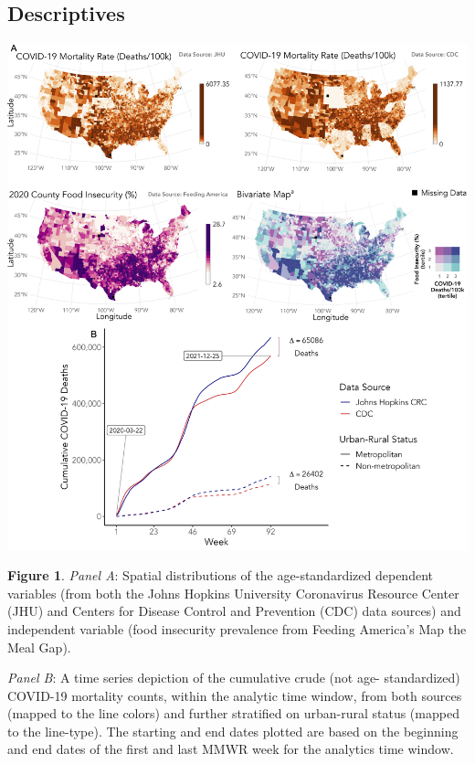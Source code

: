 \documentclass{beamer}
\begin{document}
\subsection{Descriptives}
\begin{frame}
	\begin{minipage}{.52\textwidth}
		\hspace{-0.5cm}
		\centering
		\includegraphics[scale=0.097]{images-logos/combo-chloro-time-series.png}\\
		
		
	\end{minipage}%
	\hspace{1.65 cm}
	\begin{minipage}{.30\textwidth}
			\vspace{-0.3 cm}
		\raggedright
	\tiny{\textbf{Figure 1}. \textit{Panel A}: Spatial distributions of the age-standardized dependent variables (from both the Johns Hopkins University Coronavirus Resource Center (JHU) and Centers for Disease Control and Prevention (CDC) data sources) and independent variable (food insecurity prevalence from Feeding America’s Map the Meal Gap). \\ 
		
\vspace{0.21cm}

		\textit{Panel B}: A time series depiction of the cumulative crude (not age- standardized) COVID-19 mortality counts, within the analytic time window, from both sources (mapped to the line colors) and further stratified on urban-rural status (mapped to the line-type). The starting and end dates plotted are based on the beginning and end dates of the first and last MMWR week for the analytics time window.}
		
	\end{minipage}
\end{frame}    
\end{document}
